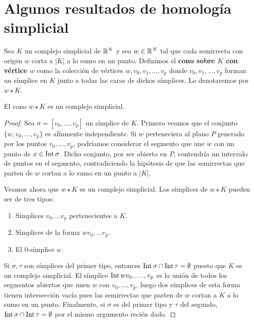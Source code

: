 \section{Algunos resultados de homología simplicial}
\begin{definicion}
	Sea $K$ un complejo simplicial de $\mathbb{R}^N$ y sea $w \in \mathbb{R}^N$ tal que cada semirrecta con origen $w$ corta a $|K|$ a lo sumo en un punto. Definimos el \textbf{cono sobre $K$ con vértice $w$} como la colección de vértices $w,v_0,v_1,\dots,v_p$ donde $v_0,v_1,\dots,v_p$ forman un símplice en $K$  junto a	todas las caras de dichos símplices. Lo denotaremos por $w \star K$.
\end{definicion}

\begin{lema}
	El cono $w \star K$ es un complejo simplicial.
\end{lema}
\begin{proof}
	Sea $\sigma = [v_0,\dots,v_p]$ un símplice de $K$. Primero veamos que el conjunto $\{w,v_0,\dots,v_p\}$ es afínmente independiente. Si $w$ perteneciera al plano $P$ generado por los puntos $v_0,\dots,v_p$, podríamos considerar el segmento que une $w$ con un punto de $x \in \operatorname{Int} \sigma$. Dicho conjunto, por ser abierto en $P$, contendría un intervalo de puntos en el segmento, contradiciendo la hipótesis de que las semirrectas que parten de $w$ cortan a lo sumo en un punto a $|K|$.
	
	Veamos ahora que $w \star K$ es un complejo simplicial. Los símplices de $w \star K$ pueden ser de tres tipos:
	\begin{enumerate}
		\item Símplices $v_0,\dots v_p$ pertenecientes a $K$.
		\item Símplices de la forma $wv_0,\dots v_p$.
		\item El $0$-símplice $w$.
	\end{enumerate}
	Si $\sigma,\tau$ son símplices del primer tipo, entonces $\operatorname{Int} \sigma \cap \operatorname{Int} \tau = \emptyset$ puesto que $K$ es un complejo simplicial. El símplice $\operatorname{Int} wv_0,\dots,v_p$ es la unión de todos los segmentos abiertos que unen $w$ con $v_0,\dots, v_p$, luego dos símplices de esta forma tienen intersección vacía pues las semirrectas que parten de $w$ cortan a $K$ a lo sumo en un punto. Finalmente, si $\sigma$ es del primer tipo y $\tau$ del segundo, $\operatorname{Int} \sigma \cap \operatorname{Int} \tau = \emptyset$ por el mismo argumento recién dado.
\end{proof}

